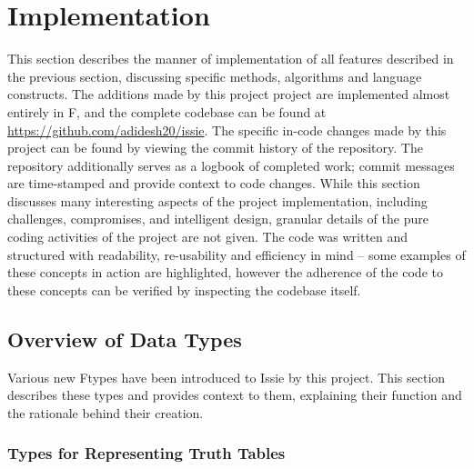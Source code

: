 \chapter{Implementation}

This section describes the manner of implementation of all features described in the previous section, discussing specific methods, algorithms and language constructs.
The additions made by this project project are implemented almost entirely in F\fsharp, and the complete codebase can be found at \url{https://github.com/adidesh20/issie}. The specific in-code changes made by this project can be found by viewing the commit history of the repository. The repository additionally serves as a logbook of completed work; commit messages are time-stamped and provide context to code changes. While this section discusses many interesting aspects of the project implementation, including challenges, compromises, and intelligent design, granular details of the pure coding activities of the project are not given. The code was written and structured with readability, re-usability and efficiency in mind -- some examples of these concepts in action are highlighted, however the adherence of the code to these concepts can be verified by inspecting the codebase itself. 

\section{Overview of Data Types}
Various new F\fsharp types have been introduced to Issie by this project. This section describes these types and provides context to them, explaining their function and the rationale behind their creation.

\subsection{Types for Representing Truth Tables}
\newcommand{\ttCellData}{
    Discriminated Union type representing what data each truth table cell can hold. Cells can hold Bits (represented by Issie's WireData type), Algebraic expressions (represented by strings), or a Don't Care.
}

\newcommand{\ttCellIO}{
    Discriminated Union type representing which input or output of the logic the data belongs to. \codestyle{CellIO}s can either be the existing \codestyle{SimulationIO} type used to describe Inputs and Outputs, or Viewers.
}

